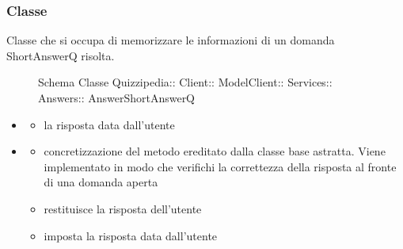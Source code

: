 \subsubsection{Classe }
Classe che si occupa di memorizzare le informazioni di un domanda ShortAnswerQ risolta.
\begin{figure}[H]
\centering
\noindent{}
\caption[Schema Classe AnswerShortAnswerQ]{Schema Classe Quizzipedia:: Client:: ModelClient:: Services:: Answers:: AnswerShortAnswerQ}
\end{figure}
\begin{itemize}
\item {}
\begin{itemize}
\item {}
\newline
la risposta data dall'utente
\end{itemize}
\item {}
\begin{itemize}
\item {}
\newline
concretizzazione del metodo ereditato dalla classe base astratta. Viene implementato in modo che verifichi la correttezza della risposta al fronte di una domanda aperta
\newline
\item {}
\newline
restituisce la risposta dell'utente
\newline
\item {}
\newline
imposta la risposta data dall'utente
\newline
\end{itemize}
\end{itemize}
